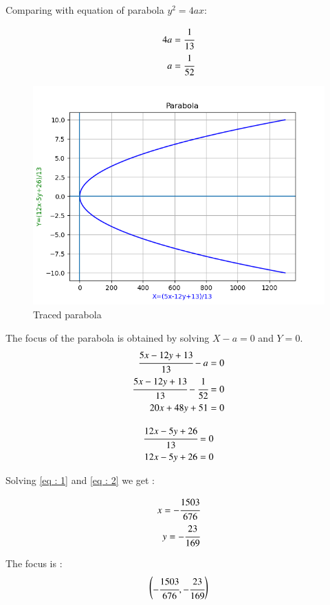 Comparing with equation of parabola $y^2=4ax$:

\begin{align}
    4a=\cfrac{1}{13}
\\
    a=\cfrac{1}{52}
\end{align}

\begin{figure}[!ht]
    \centering
    \includegraphics[width=\columnwidth]{./figs/parabola}
\caption{Traced parabola}
\label{parabola}
\end{figure}

The focus of the parabola is obtained by solving $X-a=0$ and $Y=0$.
\begin{align}
    \cfrac{5x-12y+13}{13}-a=0
\\
    \cfrac{5x-12y+13}{13}-\cfrac{1}{52}=0
\\
    20x+48y+51=0\label{eq : 1}
\end{align}

\begin{align}
    \cfrac{12x-5y+26}{13}=0
\\
    12x-5y+26=0 \label{eq : 2}
\end{align} 
 
Solving \ref{eq : 1} and \ref{eq : 2} we get :

\begin{align}
    x=-\cfrac{1503}{676}
\\
    y=-\cfrac{23}{169}
\end{align}

The focus is :
\begin{align}
    \begin{pmatrix}-\cfrac{1503}{676},-\cfrac{23}{169}\end{pmatrix}
\end{align}



